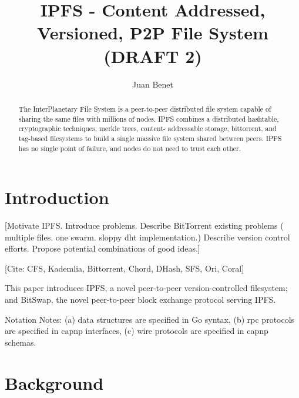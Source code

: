 \documentclass{sig-alternate}
\begin{document}
\title{IPFS - Content Addressed, Versioned, P2P File System (DRAFT 2)}
\subtitle{}


\author{
\alignauthor
  Juan Benet\\
}

\maketitle
\begin{abstract}
The InterPlanetary File System is a peer-to-peer distributed file system
capable of sharing the same files with millions of nodes. IPFS combines a
distributed hashtable, cryptographic techniques, merkle trees, content-
addressable storage, bittorrent, and tag-based filesystems to build a single
massive file system shared between peers. IPFS has no single point of failure,
and nodes do not need to trust each other.
\end{abstract}

\section{Introduction}

[Motivate IPFS. Introduce problems. Describe BitTorrent existing problems (
multiple files. one swarm. sloppy dht implementation.) Describe version
control efforts. Propose potential combinations of good ideas.]

[Cite:
CFS,
Kademlia,
Bittorrent,
Chord,
DHash,
SFS,
Ori,
Coral]

This paper introduces
IPFS, a novel peer-to-peer version-controlled filesystem;
and BitSwap, the novel peer-to-peer block exchange protocol serving IPFS.


Notation Notes:
(a) data structures are specified in Go syntax,
(b) rpc protocols are specified in capnp interfaces,
(c) wire protocols are specified in capnp schemas.

\section{Background}
\end{document}
